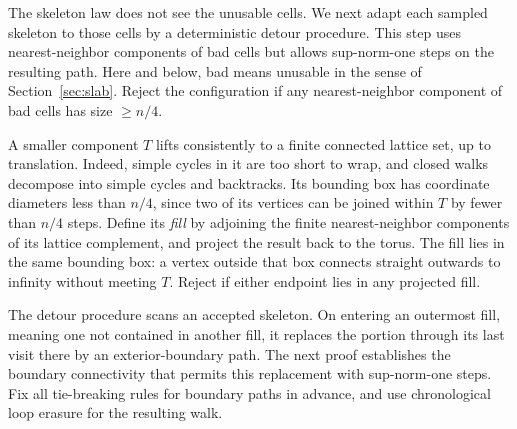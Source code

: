 The skeleton law does not see the unusable cells. We next adapt each
sampled skeleton to those cells by a deterministic detour procedure.
This step uses nearest-neighbor components of bad cells but allows
sup-norm-one steps on the resulting path. Here and below, bad means
unusable in the sense of Section~\ref{sec:slab}. Reject the configuration
if any nearest-neighbor component of bad cells has size \(\ge n/4\).

A smaller component \(T\) lifts consistently to a finite connected
lattice set, up to translation. Indeed, simple cycles in it are too
short to wrap, and closed walks decompose into simple cycles and
backtracks. Its bounding box has coordinate diameters less than
\(n/4\), since two of its vertices can be joined within \(T\) by
fewer than \(n/4\) steps. Define its \emph{fill} by adjoining the
finite nearest-neighbor components of its lattice complement, and
project the result back to the torus. The fill lies in the same
bounding box: a vertex outside that box connects straight outwards
to infinity without meeting \(T\). Reject if either endpoint lies
in any projected fill.

The detour procedure scans an accepted skeleton. On entering an
outermost fill, meaning one not contained in another fill, it replaces
the portion through its last visit there by an exterior-boundary path.
The next proof establishes the boundary
connectivity that permits this replacement with sup-norm-one steps.
Fix all tie-breaking rules for boundary paths in advance, and use
chronological loop erasure for the resulting walk.

